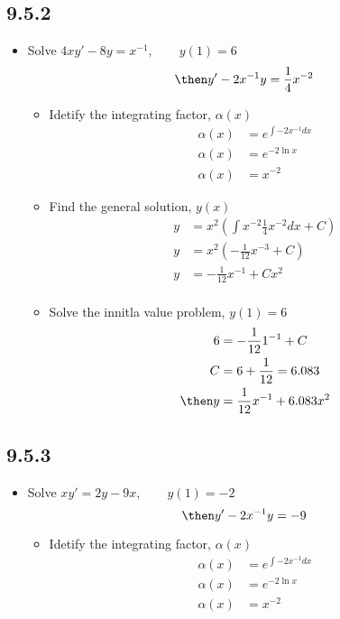 \begin{itemize}
  \subsection{9.5.2}
  \begin{itemize}
    \item Solve \(4xy' - 8y = x^{-1}, \qquad y(1) = 6\)
      \[%
      \then y' - 2x^{-1}y = \frac{1}{4}x^{-2}
      \]%
      \begin{itemize}
        \item Idetify the integrating factor, \(\alpha(x)\)
          \begin{align*}
            \alpha(x) &= e^{\int -2x^{-1} dx} \\
            \alpha(x) &= e^{-2\ln x} \\
            \alpha(x) &= x^{-2}
          \end{align*}

        \item Find the general solution, \(y(x)\)
          \begin{align*}
            y &= x^{2} \left( \int  x^{-2} \frac{1}{4}x^{-2} dx + C \right) \\
            y &= x^{2} \left( -\frac{1}{12}x^{-3}  + C \right) \\
            y &= -\frac{1}{12}x^{-1} + Cx^{2} \\
          \end{align*}

        \item Solve the innitla value problem, \(y(1) = 6\)
          \begin{align*}
            6 &= -\frac{1}{12}1^{-1} + C  \\
            C &= 6+\frac{1}{12} = 6.083 \\
            \then
            y &= \frac{1}{12}x^{-1} + 6.083x^2
          \end{align*}
      \end{itemize}
  \end{itemize}

  \subsection{9.5.3}
  \begin{itemize}
    \item Solve \(xy' = 2y - 9x, \qquad y(1) = -2\)
      \[%
      \then y' - 2x^{-1}y = -9
      \]%
      \begin{itemize}
        \item Idetify the integrating factor, \(\alpha(x)\)
          \begin{align*}
            \alpha (x) &= e^{\int -2x^{-1} dx} \\
            \alpha (x) &= e^{-2 \ln  x} \\
            \alpha (x) &= x^{-2}
          \end{align*}


\end{itemize}
\end{itemize}
\end{itemize}
